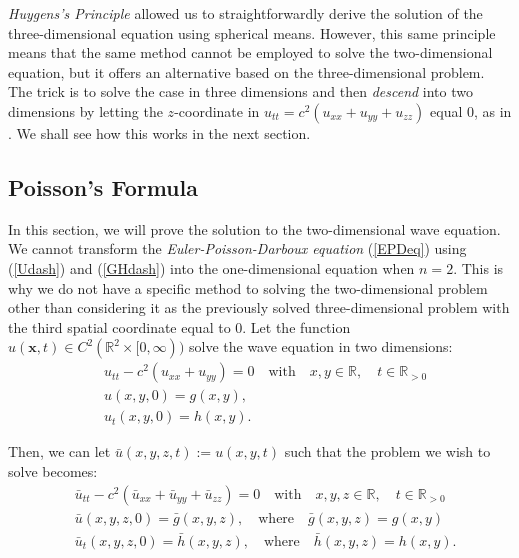 \documentclass[a4paper, 12pt]{article}
\numberwithin{equation}{section}
\begin{document}
\emph{Huygens's Principle} allowed us to straightforwardly derive the solution
of the three-dimensional equation using spherical means. However, this same
principle means that the same method cannot be employed to solve the
two-dimensional equation, but it offers an alternative based on the
three-dimensional problem. The trick is to solve the case in three dimensions
and then \emph{descend} into two dimensions by letting the $z$-coordinate in
$u_{tt}=c^2(u_{xx}+u_{yy}+u_{zz})$ equal $0$, as in \cite[Ch. 2.4.1.c]{Ev}. We shall see how
this works in the next section. 

\subsection{Poisson's Formula}

In this section, we will prove the solution to the two-dimensional wave
equation. We cannot transform the \emph{Euler-Poisson-Darboux equation}
(\ref{EPDeq}) using (\ref{Udash}) and (\ref{GHdash}) into the one-dimensional
equation when $n=2$. This is why we do not have a specific method to solving the
two-dimensional problem other than considering it as the previously solved
three-dimensional problem with the third spatial coordinate equal to $0$. Let
the function $u(\boldsymbol{x},t) \in C^2(\mathbb{R}^2 \times [0, \infty))$
solve the wave equation in two dimensions:
\begin{equation} \label{2d}
    \begin{aligned}
        &u_{tt}-c^2(u_{xx}+u_{yy})=0 \quad \textrm{with} \quad x,y \in \mathbb{R}, \quad t\in \mathbb{R}_{>0}\\
        &u(x, y, 0)=g(x,y),\\
        &u_t(x,y,0)=h(x,y).
    \end{aligned}
\end{equation}

Then, we can let $\bar{u}(x, y, z, t):=u(x, y, t)$ such that the problem we wish
to solve becomes:
\begin{equation} \label{2das3d}
    \begin{aligned}
        &\bar{u}_{tt}-c^2(\bar{u}_{xx}+\bar{u}_{yy}+\bar{u}_{zz})=0 \quad \textrm{with} \quad x,y,z \in \mathbb{R}, \quad t\in \mathbb{R}_{>0}\\
        &\bar{u}(x, y, z, 0)=\bar{g}(x,y,z), \quad \textrm{where} \quad \bar{g}(x,y,z)=g(x,y)\\
        &\bar{u}_t(x,y,z,0)=\bar{h}(x,y,z), \quad \textrm{where} \quad \bar{h}(x,y,z)=h(x,y).
    \end{aligned}
\end{equation}
\end{document}
